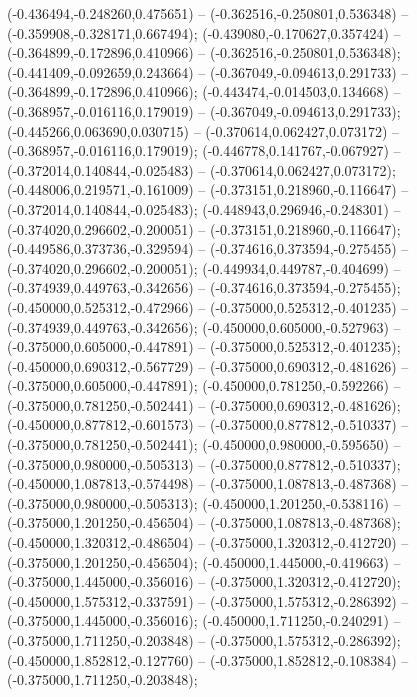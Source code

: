  (-0.436494,-0.248260,0.475651) -- (-0.362516,-0.250801,0.536348) -- (-0.359908,-0.328171,0.667494);
 (-0.439080,-0.170627,0.357424) -- (-0.364899,-0.172896,0.410966) -- (-0.362516,-0.250801,0.536348);
 (-0.441409,-0.092659,0.243664) -- (-0.367049,-0.094613,0.291733) -- (-0.364899,-0.172896,0.410966);
 (-0.443474,-0.014503,0.134668) -- (-0.368957,-0.016116,0.179019) -- (-0.367049,-0.094613,0.291733);
 (-0.445266,0.063690,0.030715) -- (-0.370614,0.062427,0.073172) -- (-0.368957,-0.016116,0.179019);
 (-0.446778,0.141767,-0.067927) -- (-0.372014,0.140844,-0.025483) -- (-0.370614,0.062427,0.073172);
 (-0.448006,0.219571,-0.161009) -- (-0.373151,0.218960,-0.116647) -- (-0.372014,0.140844,-0.025483);
 (-0.448943,0.296946,-0.248301) -- (-0.374020,0.296602,-0.200051) -- (-0.373151,0.218960,-0.116647);
 (-0.449586,0.373736,-0.329594) -- (-0.374616,0.373594,-0.275455) -- (-0.374020,0.296602,-0.200051);
 (-0.449934,0.449787,-0.404699) -- (-0.374939,0.449763,-0.342656) -- (-0.374616,0.373594,-0.275455);
 (-0.450000,0.525312,-0.472966) -- (-0.375000,0.525312,-0.401235) -- (-0.374939,0.449763,-0.342656);
 (-0.450000,0.605000,-0.527963) -- (-0.375000,0.605000,-0.447891) -- (-0.375000,0.525312,-0.401235);
 (-0.450000,0.690312,-0.567729) -- (-0.375000,0.690312,-0.481626) -- (-0.375000,0.605000,-0.447891);
 (-0.450000,0.781250,-0.592266) -- (-0.375000,0.781250,-0.502441) -- (-0.375000,0.690312,-0.481626);
 (-0.450000,0.877812,-0.601573) -- (-0.375000,0.877812,-0.510337) -- (-0.375000,0.781250,-0.502441);
 (-0.450000,0.980000,-0.595650) -- (-0.375000,0.980000,-0.505313) -- (-0.375000,0.877812,-0.510337);
 (-0.450000,1.087813,-0.574498) -- (-0.375000,1.087813,-0.487368) -- (-0.375000,0.980000,-0.505313);
 (-0.450000,1.201250,-0.538116) -- (-0.375000,1.201250,-0.456504) -- (-0.375000,1.087813,-0.487368);
 (-0.450000,1.320312,-0.486504) -- (-0.375000,1.320312,-0.412720) -- (-0.375000,1.201250,-0.456504);
 (-0.450000,1.445000,-0.419663) -- (-0.375000,1.445000,-0.356016) -- (-0.375000,1.320312,-0.412720);
 (-0.450000,1.575312,-0.337591) -- (-0.375000,1.575312,-0.286392) -- (-0.375000,1.445000,-0.356016);
 (-0.450000,1.711250,-0.240291) -- (-0.375000,1.711250,-0.203848) -- (-0.375000,1.575312,-0.286392);
 (-0.450000,1.852812,-0.127760) -- (-0.375000,1.852812,-0.108384) -- (-0.375000,1.711250,-0.203848);
